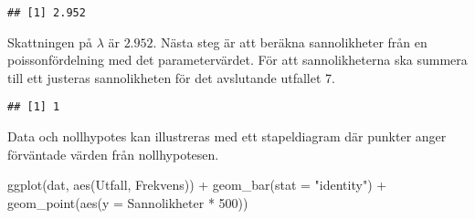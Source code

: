 \documentclass[
]{book}
\newenvironment{Shaded}{\begin{snugshade}}{\end{snugshade}}
\newcommand{\AttributeTok}[1]{\textcolor[rgb]{0.77,0.63,0.00}{#1}}
\newcommand{\DecValTok}[1]{\textcolor[rgb]{0.00,0.00,0.81}{#1}}
\newcommand{\FunctionTok}[1]{\textcolor[rgb]{0.00,0.00,0.00}{#1}}
\newcommand{\NormalTok}[1]{#1}
\newcommand{\OtherTok}[1]{\textcolor[rgb]{0.56,0.35,0.01}{#1}}
\newcommand{\SpecialCharTok}[1]{\textcolor[rgb]{0.00,0.00,0.00}{#1}}
\newcommand{\StringTok}[1]{\textcolor[rgb]{0.31,0.60,0.02}{#1}}
\theoremstyle{definition}
\theoremstyle{definition}
\theoremstyle{definition}
\theoremstyle{definition}
\theoremstyle{remark}
\begin{document}
\begin{Shaded}
\end{Shaded}

\begin{verbatim}
## [1] 2.952
\end{verbatim}

Skattningen på \(\lambda\) är \(2.952\). Nästa steg är att beräkna sannolikheter från en poissonfördelning med det parametervärdet. För att sannolikheterna ska summera till ett justeras sannolikheten för det avslutande utfallet 7.

\begin{Shaded}
\end{Shaded}

\begin{verbatim}
## [1] 1
\end{verbatim}

Data och nollhypotes kan illustreras med ett stapeldiagram där punkter anger förväntade värden från nollhypotesen.

\begin{Shaded}
\begin{Highlighting}[]
\FunctionTok{ggplot}\NormalTok{(dat, }\FunctionTok{aes}\NormalTok{(Utfall, Frekvens)) }\SpecialCharTok{+}
  \FunctionTok{geom\_bar}\NormalTok{(}\AttributeTok{stat =} \StringTok{"identity"}\NormalTok{) }\SpecialCharTok{+}
  \FunctionTok{geom\_point}\NormalTok{(}\FunctionTok{aes}\NormalTok{(}\AttributeTok{y =}\NormalTok{ Sannolikheter }\SpecialCharTok{*} \DecValTok{500}\NormalTok{))}
\end{Highlighting}
\end{Shaded}
\end{document}
